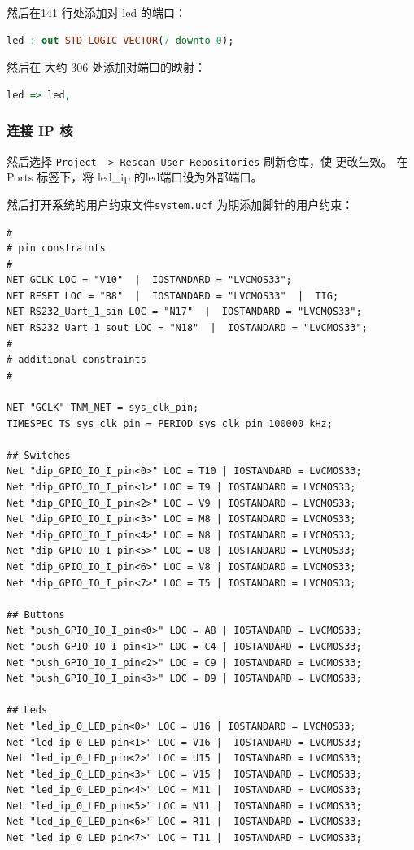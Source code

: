 \documentclass{ctexart}
\begin{document}
然后在141 行处添加对 led 的端口：
\begin{lstlisting}[language=VHDL]
led : out STD_LOGIC_VECTOR(7 downto 0);
\end{lstlisting}

然后在 大约 306 处添加对端口的映射：
\begin{lstlisting}[language=VHDL]
led => led,
\end{lstlisting}

\subsubsection{连接 IP 核}

然后选择 \verb|Project -> Rescan User Repositories| 刷新仓库，使
更改生效。
在 Ports 标签下，将 led\_ip 的led端口设为外部端口。

然后打开系统的用户约束文件\verb|system.ucf| 为期添加脚针的用户约束：
\begin{lstlisting}
#
# pin constraints
#
NET GCLK LOC = "V10"  |  IOSTANDARD = "LVCMOS33";
NET RESET LOC = "B8"  |  IOSTANDARD = "LVCMOS33"  |  TIG;
NET RS232_Uart_1_sin LOC = "N17"  |  IOSTANDARD = "LVCMOS33";
NET RS232_Uart_1_sout LOC = "N18"  |  IOSTANDARD = "LVCMOS33";
#
# additional constraints
#

NET "GCLK" TNM_NET = sys_clk_pin;
TIMESPEC TS_sys_clk_pin = PERIOD sys_clk_pin 100000 kHz;

## Switches
Net "dip_GPIO_IO_I_pin<0>" LOC = T10 | IOSTANDARD = LVCMOS33;
Net "dip_GPIO_IO_I_pin<1>" LOC = T9 | IOSTANDARD = LVCMOS33;
Net "dip_GPIO_IO_I_pin<2>" LOC = V9 | IOSTANDARD = LVCMOS33;
Net "dip_GPIO_IO_I_pin<3>" LOC = M8 | IOSTANDARD = LVCMOS33;
Net "dip_GPIO_IO_I_pin<4>" LOC = N8 | IOSTANDARD = LVCMOS33;
Net "dip_GPIO_IO_I_pin<5>" LOC = U8 | IOSTANDARD = LVCMOS33;
Net "dip_GPIO_IO_I_pin<6>" LOC = V8 | IOSTANDARD = LVCMOS33;
Net "dip_GPIO_IO_I_pin<7>" LOC = T5 | IOSTANDARD = LVCMOS33;

## Buttons
Net "push_GPIO_IO_I_pin<0>" LOC = A8 | IOSTANDARD = LVCMOS33;
Net "push_GPIO_IO_I_pin<1>" LOC = C4 | IOSTANDARD = LVCMOS33;
Net "push_GPIO_IO_I_pin<2>" LOC = C9 | IOSTANDARD = LVCMOS33;
Net "push_GPIO_IO_I_pin<3>" LOC = D9 | IOSTANDARD = LVCMOS33;

## Leds
Net "led_ip_0_LED_pin<0>" LOC = U16 | IOSTANDARD = LVCMOS33; 
Net "led_ip_0_LED_pin<1>" LOC = V16 |  IOSTANDARD = LVCMOS33; 
Net "led_ip_0_LED_pin<2>" LOC = U15 |  IOSTANDARD = LVCMOS33; 
Net "led_ip_0_LED_pin<3>" LOC = V15 |  IOSTANDARD = LVCMOS33; 
Net "led_ip_0_LED_pin<4>" LOC = M11 |  IOSTANDARD = LVCMOS33; 
Net "led_ip_0_LED_pin<5>" LOC = N11 |  IOSTANDARD = LVCMOS33;
Net "led_ip_0_LED_pin<6>" LOC = R11 |  IOSTANDARD = LVCMOS33; 
Net "led_ip_0_LED_pin<7>" LOC = T11 |  IOSTANDARD = LVCMOS33;
\end{lstlisting}
\end{document}
